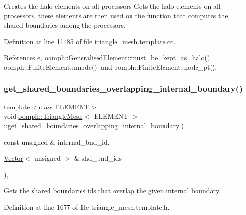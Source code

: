 Creates the halo elements on all processors Gets the halo elements on all processors, these elements are then used on the function that computes the shared boundaries among the processors. 



Definition at line 11485 of file triangle\+\_\+mesh.\+template.\+cc.



References e, oomph\+::\+Generalised\+Element\+::must\+\_\+be\+\_\+kept\+\_\+as\+\_\+halo(), oomph\+::\+Finite\+Element\+::nnode(), and oomph\+::\+Finite\+Element\+::node\+\_\+pt().

\mbox{\label{classoomph_1_1TriangleMesh_ade5d5a18ddf4cae94f98e1bda364f6a8}} 
\subsubsection{\texorpdfstring{get\+\_\+shared\+\_\+boundaries\+\_\+overlapping\+\_\+internal\+\_\+boundary()}{get\_shared\_boundaries\_overlapping\_internal\_boundary()}}
{\footnotesize\ttfamily template$<$class E\+L\+E\+M\+E\+NT$>$ \\
void \hyperlink{classoomph_1_1TriangleMesh}{oomph\+::\+Triangle\+Mesh}$<$ E\+L\+E\+M\+E\+NT $>$\+::get\+\_\+shared\+\_\+boundaries\+\_\+overlapping\+\_\+internal\+\_\+boundary (\begin{DoxyParamCaption}\item[{const unsigned \&}]{internal\+\_\+bnd\+\_\+id,  }\item[{\hyperlink{classoomph_1_1Vector}{Vector}$<$ unsigned $>$ \&}]{shd\+\_\+bnd\+\_\+ids }\end{DoxyParamCaption})\hspace{0.3cm}{\ttfamily [inline]}, {\ttfamily [protected]}}



Gets the shared boundaries ids that overlap the given internal boundary. 



Definition at line 1677 of file triangle\+\_\+mesh.\+template.\+h.

